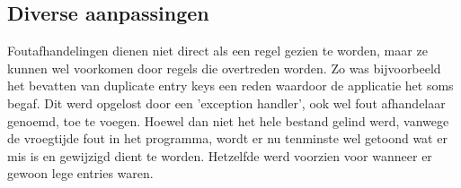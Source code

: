 \subsection{Diverse aanpassingen}
Foutafhandelingen dienen niet direct als een regel gezien te worden, maar ze kunnen wel voorkomen door regels die overtreden worden. Zo was bijvoorbeeld het bevatten van duplicate entry keys een reden waardoor de applicatie het soms begaf. Dit werd opgelost door een 'exception handler', ook wel fout afhandelaar genoemd, toe te voegen. Hoewel dan niet het hele bestand gelind werd, vanwege de vroegtijde fout in het programma, wordt er nu tenminste wel getoond wat er mis is en gewijzigd dient te worden. Hetzelfde werd voorzien voor wanneer er gewoon lege entries waren. 
